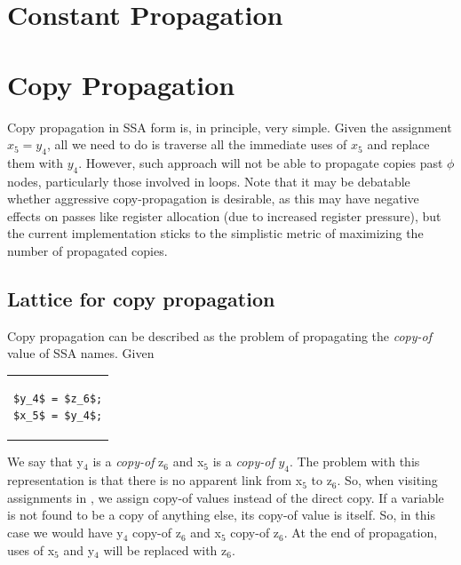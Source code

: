 \section{Constant Propagation}
\label{novillo:sec:constant-prop}

\section{Copy Propagation}
\label{novillo:sec:copy-prop}

Copy propagation in SSA form is, in principle, very simple.  Given
the assignment $x_5 = y_4$, all we need to do is traverse all the
immediate uses of $x_5$ and replace them with $y_4$.  However,
such approach will not be able to propagate copies past $\phi$
nodes, particularly those involved in loops.  Note that it may be
debatable whether aggressive copy-propagation is desirable, as
this may have negative effects on passes like register allocation
(due to increased register pressure), but the current
implementation sticks to the simplistic metric of maximizing the
number of propagated copies.

\subsection{Lattice for copy propagation}

Copy propagation can be described as the problem of propagating
the \textit{copy-of} value of SSA names.  Given

\begin{center}
  \begin{tabular}{c}
    \begin{lstlisting}
$y_4$ = $z_6$;
$x_5$ = $y_4$;
    \end{lstlisting}
  \end{tabular}
\end{center}

We say that y$_4$ is a \textit{copy-of} z$_6$ and x$_5$ is a
\textit{copy-of} $y_4$.  The problem with this representation is
that there is no apparent link from x$_5$ to z$_6$.  So, when
visiting assignments in , we assign
copy-of values instead of the direct copy.  If a variable is not
found to be a copy of anything else, its copy-of value is itself.
So, in this case we would have y$_4$ copy-of z$_6$ and x$_5$
copy-of z$_6$.  At the end of propagation, uses of x$_5$ and y$_4$
will be replaced with z$_6$.


